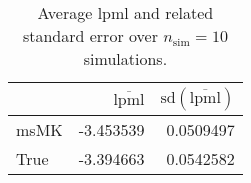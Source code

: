 \begin{table}[H]

\caption{Average lpml and related standard error over $n_{\text{sim}} = 10$ simulations.}
\centering
\begin{tabular}[t]{lrr}
\toprule
  & $\overbar{\text{lpml}}$ & $\text{sd}(\overbar{\text{lpml}})$\\
\midrule
msMK & -3.453539 & 0.0509497\\
True & -3.394663 & 0.0542582\\
\bottomrule
\end{tabular}
\end{table}
